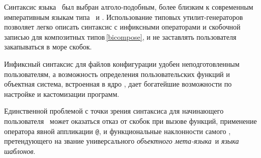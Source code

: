 \secdown

Синтаксис языка \bi\ был выбран алголо-подобным, более близким к современным
императивным языкам типа \cpp\ и \py. Использование типовых утилит-генераторов
позволяет легко описать синтаксис с инфиксными операторами и скобочной записью
для композитных типов\,\ref{bicompose}, и не заставлять пользователя
закапываться в море  скобок.

Инфиксный синтаксис для файлов конфигурации удобен неподготовленным
пользователям, а возможность определения пользовательских функций и объектная
система, встроенная в ядро \bi, дает богатейшие возможности по настройке
и кастомизации программ.

Единственной проблемой с точки зрения синтаксиса для начинающего пользователя
\bi\ может оказаться отказ от скобок при вызове функций, применение оператора
явной аппликации \verb|@|, и функциональные наклонности самого \bi,
претендующего на звание универсального \emph{объектного мета-языка}\ и
\emph{языка шаблонов}.

\label{bilexer}
\label{biparser}
\secup
